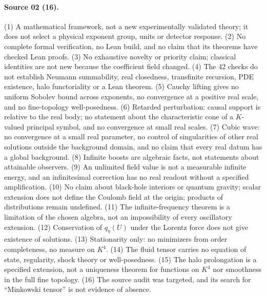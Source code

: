 \documentclass[11pt,letterpaper]{article}
\theoremstyle{definition}
\theoremstyle{remark}
\begin{document}
\paragraph{Source 02 (16).}
(1) A mathematical framework, not a new experimentally validated theory; it does
not select a physical exponent group, units or detector response. (2) No complete
formal verification, no Lean build, and no claim that its theorems have checked
Lean proofs. (3) No exhaustive novelty or priority claim; classical identities are
not new because the coefficient field changed. (4) The 42 checks do not
establish Neumann summability, real closedness, transfinite recursion, PDE
existence, halo functoriality or a Lean theorem. (5) Cauchy lifting gives no
uniform Sobolev bound across exponents, no convergence at a positive real scale,
and no fine-topology well-posedness. (6) Retarded perturbation: causal support is
relative to the real body; no statement about the characteristic cone of a
$K$-valued principal symbol, and no convergence at small real scales. (7) Cubic
wave: no convergence at a small real parameter, no control of singularities of
other real solutions outside the background domain, and no claim that every real
datum has a global background. (8) Infinite boosts are algebraic facts, not
statements about attainable observers. (9) An unlimited field value is not a
measurable infinite energy, and an infinitesimal correction has no real readout
without a specified amplification. (10) No claim about black-hole interiors or
quantum gravity; scalar extension does not define the Coulomb field at the
origin; products of distributions remain undefined. (11) The infinite-frequency
theorem is a limitation of the chosen algebra, not an impossibility of every
oscillatory extension. (12) Conservation of $q_\eta(U)$ under the Lorentz force
does not give existence of solutions. (13) Stationarity only: no minimizers from
order completeness, no measure on $K^4$. (14) The fluid tensor carries no
equation of state, regularity, shock theory or well-posedness. (15) The
halo prolongation is a specified extension, not a uniqueness theorem for
functions on $K^4$ nor smoothness in the full fine topology. (16) The source
audit was targeted, and its search for ``Minkowski tensor'' is not evidence of
absence.
\end{document}
